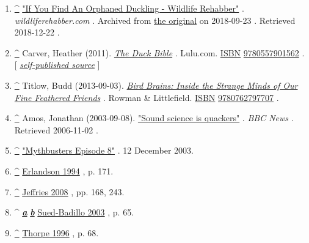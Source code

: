 \documentclass[11pt,a4paper]{article}
\begin{document}
\begin{enumerate}
\item \href{\#cite\_ref-28}{\textbf{\textasciicircum{}}} \href{https://web.archive.org/web/20180923152911/http://wildliferehabber.com/content/if-you-find-duckling}{"If You Find An Orphaned Duckling - Wildlife Rehabber"} . \textit{wildliferehabber.com} . Archived from \href{https://wildliferehabber.com/content/if-you-find-duckling}{the original} on 2018-09-23 . Retrieved 2018-12-22 .
\item \href{\#cite\_ref-29}{\textbf{\textasciicircum{}}} Carver, Heather (2011). \href{https://books.google.com/books?id=VGofAwAAQBAJ\&q=mallard+sound+deep+and+raspy\&pg=PA39}{\textit{The Duck Bible}} . Lulu.com. \href{/wiki/ISBN\_(identifier)}{ISBN} \href{/wiki/Special:BookSources/9780557901562}{9780557901562} . [ \href{/wiki/Wikipedia:Verifiability\#Self-published\_sources}{\textit{self-published source}} ]
\item \href{\#cite\_ref-30}{\textbf{\textasciicircum{}}} Titlow, Budd (2013-09-03). \href{https://books.google.com/books?id=fXJBBAAAQBAJ\&q=Females+of+most+dabbling+ducks+make+the+classic+\%22quack\%22+sound+but+most+ducks+don\%27t+quack\&pg=PA123}{\textit{Bird Brains: Inside the Strange Minds of Our Fine Feathered Friends}} . Rowman \& Littlefield. \href{/wiki/ISBN\_(identifier)}{ISBN} \href{/wiki/Special:BookSources/9780762797707}{9780762797707} .
\item \href{\#cite\_ref-31}{\textbf{\textasciicircum{}}} Amos, Jonathan (2003-09-08). \href{http://news.bbc.co.uk/2/hi/science/nature/3086890.stm}{"Sound science is quackers"} . \textit{BBC News} . Retrieved 2006-11-02 .
\item \href{\#cite\_ref-32}{\textbf{\textasciicircum{}}} \href{http://mythbustersresults.com/episode8}{"Mythbusters Episode 8"} . 12 December 2003.
\item \href{\#cite\_ref-FOOTNOTEErlandson1994171\_33-0}{\textbf{\textasciicircum{}}} \href{\#CITEREFErlandson1994}{Erlandson 1994} , p. 171.
\item \href{\#cite\_ref-FOOTNOTEJeffries2008168,\_243\_34-0}{\textbf{\textasciicircum{}}} \href{\#CITEREFJeffries2008}{Jeffries 2008} , pp. 168, 243.
\item \textasciicircum{} \href{\#cite\_ref-FOOTNOTESued-Badillo200365\_35-0}{\textit{\textbf{a}}} \href{\#cite\_ref-FOOTNOTESued-Badillo200365\_35-1}{\textit{\textbf{b}}} \href{\#CITEREFSued-Badillo2003}{Sued-Badillo 2003} , p. 65.
\item \href{\#cite\_ref-FOOTNOTEThorpe199668\_36-0}{\textbf{\textasciicircum{}}} \href{\#CITEREFThorpe1996}{Thorpe 1996} , p. 68.

\end{enumerate}
\end{document}
